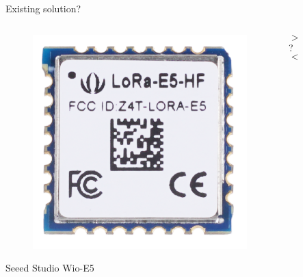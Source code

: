 \documentclass{beamer}
\begin{document}
\begin{frame}{Existing solution?}
\begin{columns}
\begin{column}{.4\textwidth}
    \centering
    \begin{figure}
        \includegraphics[width=\linewidth]{img/wio-e5.png}
    \end{figure}
    Seeed Studio Wio-E5
\end{column}
\hfil
\begin{column}{.1\textwidth}
    \centering
    \Large
    \vspace{-2em}
    $$>$$
    ?
    $$<$$
\end{column}
\hfil
\begin{column}{.4\textwidth}
    \centering
    \begin{figure}

\end{figure}
\end{column}
\end{columns}
\end{frame}
\end{document}
